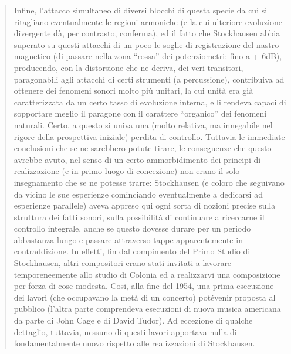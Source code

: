 \begin{quote}
	Infine, l’attacco simultaneo di diversi blocchi di questa specie da cui si ritagliano eventualmente le regioni armoniche (e la cui ulteriore evoluzione divergente dà, per contrasto, conferma), ed il fatto che Stockhausen abbia superato su questi attacchi di un poco le soglie di registrazione del nastro magnetico (di passare nella zona “rossa” dei potenziometri: fino a + 6dB), producendo, con la distorsione che ne deriva, dei veri transitori, paragonabili agli attacchi di certi strumenti (a percussione), contribuiva ad ottenere dei fenomeni sonori molto più unitari, la cui unità era già caratterizzata da un certo tasso di evoluzione interna, e li rendeva capaci di sopportare meglio il paragone con il carattere “organico” dei fenomeni naturali. Certo, a questo si univa una (molto relativa, ma innegabile nel rigore della prospettiva iniziale) perdita di controllo. Tuttavia le immediate conclusioni che se ne sarebbero potute tirare, le conseguenze che questo avrebbe avuto, nel senso di un certo ammorbidimento dei principi di realizzazione (e in primo luogo di concezione) non erano il solo insegnamento che se ne potesse trarre: Stockhausen (e coloro che seguivano da vicino le sue esperienze cominciando eventualmente a dedicarsi ad esperienze parallele) aveva appreso qui ogni sorta di nozioni precise sulla struttura dei fatti sonori, sulla possibilità di continuare a ricercarne il controllo integrale, anche se questo dovesse durare per un periodo abbastanza lungo e passare attraverso tappe apparentemente in contraddizione.
	In effetti, fin dal compimento del Primo Studio di Stockhausen, altri compositori erano stati invitati a lavorare temporeneemente allo studio di Colonia ed a realizzarvi una composizione per forza di cose modesta. Cosi, alla fine del 1954, una prima esecuzione dei lavori (che occupavano la metà di un concerto) potévenir proposta al pubblico (l’altra parte comprendeva esecuzioni di nuova musica americana da parte di John Cage e di David Tudor). Ad eccezione di qualche dettaglio, tuttavia, nessuno di questi lavori apportava nulla di fondamentalmente nuovo rispetto alle realizzazioni di Stockhausen.


\end{quote}
